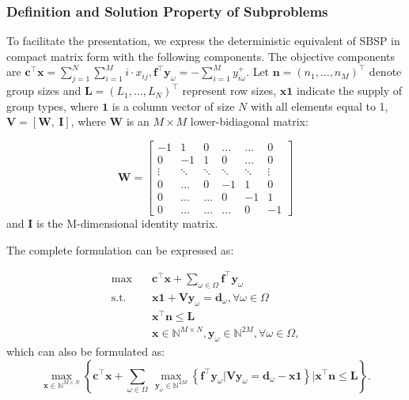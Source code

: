 \subsubsection{Definition and Solution Property of Subproblems}
To facilitate the presentation, we express the deterministic equivalent of SBSP in compact matrix form with the following components. The objective components are $\mathbf{c}^{\intercal}\mathbf{x} = \sum_{j =1}^{N} \sum_{i=1}^M i \cdot x_{ij}, \mathbf{f}^{\intercal}\mathbf{y}_{\omega} = -\sum_{i=1}^{M} y_{i \omega}^{+}$. Let $\mathbf{n} = (n_1, \ldots, n_M)^{\intercal}$ denote group sizes and $\mathbf{L} = (L_1, \ldots, L_N)^{\intercal}$ represent row sizes, $\mathbf{x} \mathbf{1}$ indicate the supply of group types, where $\mathbf{1}$ is a column vector of size $N$ with all elements equal to 1, $\mathbf{V} = [\mathbf{W}, ~\mathbf{I}]$, where $\mathbf{W}$ is an $M \times M$ lower-bidiagonal matrix:

$$
\mathbf{W}=\left[\begin{array}{cccccc}
-1 & 1 & 0 & \ldots & \ldots & 0 \\
0 & -1 & 1 &    0   & \ldots & 0 \\
\vdots & \ddots & \ddots & \ddots & \ddots & \vdots \\
0  & \ldots   &  0  & -1 & 1 & 0 \\
0  & \ldots   &  \ldots  &  0 &  -1 & 1 \\
0 & \ldots & \ldots & \ldots & 0 & -1
\end{array}\right]
$$
and $\mathbf{I}$ is the M-dimensional identity matrix.

The complete formulation can be expressed as:

\begin{equation}\label{BD_master}
  \begin{aligned}
  \max \quad & \mathbf{c}^{\intercal} \mathbf{x}+ \sum_{\omega \in \Omega} \mathbf{f}^{\intercal} \mathbf{y}_{\omega} \\
  \text {s.t.} \quad & \mathbf{x} \mathbf{1} + \mathbf{V} \mathbf{y}_{\omega} = \mathbf{d}_{\omega}, \forall \omega \in \Omega  \\
  & \mathbf{x}^{\intercal} \mathbf{n} \leq \mathbf{L} \\
  & \mathbf{x} \in \mathbb{N}^{M \times N}, \mathbf{y}_{\omega} \in \mathbb{N}^{2M}, \forall \omega \in \Omega, 
  \end{aligned}
\end{equation}
which can also be formulated as:
\begin{equation}\label{BD_master1}
  \max_{\mathbf{x} \in \mathbb{N}^{M \times N}} \left\{ \mathbf{c}^{\intercal} \mathbf{x} + \sum_{\omega \in \Omega} ~ \max_{\mathbf{y}_{\omega} \in \mathbb{N}^{2M}} \left\{\mathbf{f}^{\intercal} \mathbf{y}_{\omega} \big| \mathbf{V} \mathbf{y}_{\omega} = \mathbf{d}_{\omega} -\mathbf{x} \mathbf{1}\right\} \bigg| \mathbf{x}^{\intercal} \mathbf{n} \leq \mathbf{L} \right\}.
\end{equation}

